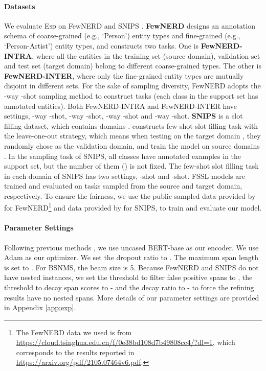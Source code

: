 \documentclass[11pt]{article}
\newcommand{\modelname}{\textsc{Esd}\xspace}
\begin{document}
\paragraph{Datasets}
We evaluate \modelname on FewNERD \cite{FewNERD} and SNIPS \cite{snips}.
\textbf{FewNERD} 
designs an annotation schema of  coarse-grained (e.g., `Person') entity types and  fine-grained (e.g., `Person-Artist') entity types, and constructs two tasks. One is \textbf{FewNERD-INTRA}, where all the entities in the training set (source domain), validation set and test set (target domain) belong to different coarse-grained types.
The other is \textbf{FewNERD-INTER}, where only the fine-grained entity types are mutually disjoint in different sets.
For the sake of sampling diversity, 
FewNERD adopts the -way -shot sampling method to construct tasks (each class in the support set has  annotated entities).
Both FewNERD-INTRA and FewNERD-INTER have  settings, -way -shot,  -way -shot,  -way -shot and  -way -shot. \textbf{SNIPS} is a slot filling dataset, which contains  domains .
\cite{fewshothou} constructs few-shot slot filling task with the leave-one-out strategy, which means when testing on the target domain , they randomly chose  as the validation domain, and train the model on source domains .
In the sampling task of SNIPS, all classes have  annotated examples in the support set, but the number of them () is not fixed.
The few-shot slot filling task in each domain of SNIPS has two settings, -shot and -shot.
FSSL models are trained and evaluated on tasks sampled from the source and target domain, respectively.
To ensure the fairness,
we use the public sampled data provided by \cite{FewNERD} for FewNERD\footnote{The FewNERD data we used is from \url{https://cloud.tsinghua.edu.cn/f/0e38bd108d7b49808cc4/?dl=1}, which corresponds to the results reported in \url{https://arxiv.org/pdf/2105.07464v6.pdf}.} and data provided by \cite{fewshothou} for SNIPS, to train and evaluate our model.

\paragraph{Parameter Settings}
Following previous methods \cite{fewshothou, FewNERD}, we use uncased BERT-base as our encoder.
We use Adam \cite{adam} as our optimizer.
We set the dropout ratio \cite{dropout} to . 
The maximum span length  is set to .
For BSNMS, the beam size  is 5.
Because FewNERD and SNIPS do not have nested instances, we set the threshold to filter false positive spans  to ,  the threshold to decay span scores  to - and the decay ratio  to - to force the refining results have no nested spans.
More details of our parameter settings are provided in Appendix \ref{app:exp}. 
\end{document}
